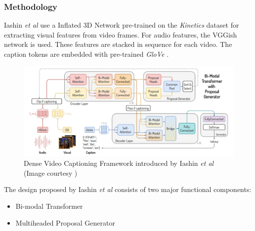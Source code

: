 \subsubsection{Methodology}

\par Iashin \textit{et al} use a Inflated 3D Network pre-trained on the \textit{Kinetics} dataset
\cite{kay2017kinetics} for extracting visual features from video
frames. For audio features, the VGGish network \cite{vggish} is used. These features are stacked in 
sequence for each video. The caption tokens are embedded with pre-trained \textit{GloVe} \cite{glove}.

\begin{figure}[h]
	\includegraphics[width=\linewidth]{assets/img/bmt-architecture.png}
	\caption{Dense Video Captioning Framework introduced by Iashin \textit{et al} (Image courtesy \cite{iashin2020better})}
\end{figure}


\par The design proposed by Iashin \textit{et al} consists of two major functional components:
\begin{itemize}
\item Bi-modal Transformer
\item Multiheaded Proposal Generator
\end{itemize}

